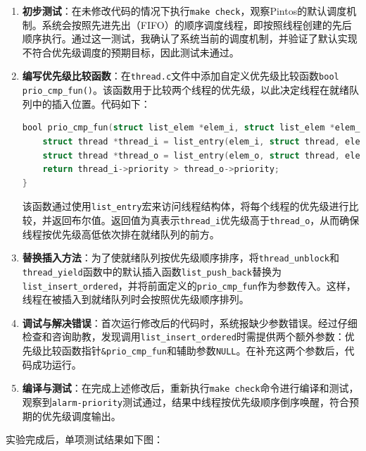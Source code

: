 \documentclass{article}
\begin{document}
\begin{enumerate}
	\item \textbf{初步测试}：在未修改代码的情况下执行\texttt{make check}，观察Pintos的默认调度机制。系统会按照先进先出（FIFO）的顺序调度线程，即按照线程创建的先后顺序执行。通过这一测试，我确认了系统当前的调度机制，并验证了默认实现不符合优先级调度的预期目标，因此测试未通过。
	
	\item \textbf{编写优先级比较函数}：在\texttt{thread.c}文件中添加自定义优先级比较函数\texttt{bool prio\_cmp\_fun()}。该函数用于比较两个线程的优先级，以此决定线程在就绪队列中的插入位置。代码如下：
	
	\begin{lstlisting}[language=C, basicstyle=\ttfamily, keywordstyle=\color{blue}]
bool prio_cmp_fun(struct list_elem *elem_i, struct list_elem *elem_o, void *aux) {
	struct thread *thread_i = list_entry(elem_i, struct thread, elem);
	struct thread *thread_o = list_entry(elem_o, struct thread, elem);
	return thread_i->priority > thread_o->priority;
}
	\end{lstlisting}
	
	该函数通过使用\texttt{list\_entry}宏来访问线程结构体，将每个线程的优先级进行比较，并返回布尔值。返回值为真表示\texttt{thread\_i}优先级高于\texttt{thread\_o}，从而确保线程按优先级高低依次排在就绪队列的前方。
	
	\item \textbf{替换插入方法}：为了使就绪队列按优先级顺序排序，将\texttt{thread\_unblock}和\texttt{thread\_yield}函数中的默认插入函数\texttt{list\_push\_back}替换为\texttt{list\_insert\_ordered}，并将前面定义的\texttt{prio\_cmp\_fun}作为参数传入。这样，线程在被插入到就绪队列时会按照优先级顺序排列。
	
	\item \textbf{调试与解决错误}：首次运行修改后的代码时，系统报缺少参数错误。经过仔细检查和咨询助教，发现调用\texttt{list\_insert\_ordered}时需提供两个额外参数：优先级比较函数指针\texttt{\&prio\_cmp\_fun}和辅助参数\texttt{NULL}。在补充这两个参数后，代码成功运行。
	
	\item \textbf{编译与测试}：在完成上述修改后，重新执行\texttt{make check}命令进行编译和测试，观察到\texttt{alarm-priority}测试通过，结果中线程按优先级顺序倒序唤醒，符合预期的优先级调度输出。
\end{enumerate}

实验完成后，单项测试结果如下图：
\end{document}
